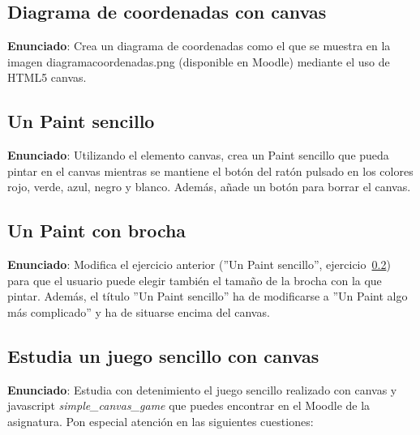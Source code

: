 \subsection{Diagrama de coordenadas con canvas}
\label{subsec:diagrama-coordenadas}

\textbf{Enunciado}: Crea un diagrama de coordenadas como el que se muestra en la imagen diagramacoordenadas.png (disponible en Moodle) mediante el uso de HTML5 canvas.

\subsection{Un Paint sencillo}
\label{subsec:paint-sencillo}

\textbf{Enunciado}: Utilizando el elemento canvas, crea un Paint sencillo que pueda pintar en el canvas mientras se mantiene el botón del ratón pulsado en los colores rojo, verde, azul, negro y blanco. Además, añade un botón para borrar el canvas.


\subsection{Un Paint con brocha}
\label{subsec:paint-brocha}

\textbf{Enunciado}: Modifica el ejercicio anterior (''Un Paint sencillo'', ejercicio~\ref{subsec:paint-sencillo}) para que el usuario puede elegir también el tamaño de la brocha con la que pintar. Además, el título ''Un Paint sencillo'' ha de modificarse a ''Un Paint algo más complicado'' y ha de situarse encima del canvas.

\subsection{Estudia un juego sencillo con canvas}
\label{subsec:estudia-juego}

\textbf{Enunciado}: Estudia con detenimiento el juego sencillo realizado
con canvas y javascript \emph{simple\_canvas\_game} que puedes encontrar en el Moodle de la asignatura. Pon especial atención en las siguientes cuestiones:

